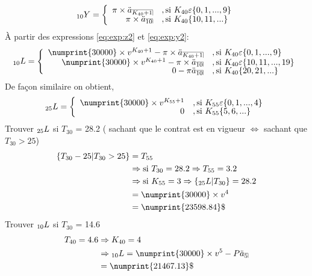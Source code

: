 \documentclass[11pt,french]{report}
\makeatletter
\DeclareRobustCommand{\annuity}[1]{%
\def\arraystretch{0}%
\setlength\arraycolsep{.7pt}%
\setlength\arrayrulewidth{.3pt}%
\begin{array}[b]{@{}c|}\hline
\\[\arraycolsep]%
\scriptstyle #1%
\end{array}%
}
\newcommand{\indiceGauche}[2]{{\vphantom{#2}}_{#1}#2}
\makeatother
\begin{document}
\begin{equation}
\label{eq:exp:y2}
\indiceGauche{10}{Y} =
     	\left\{
     	\begin{array}{rl}
     	\pi\times \ddot{a}_{\annuity{K_{40} + 1}} &, \text{si } K_{40} \varepsilon \lbrace0,1,..., 9\rbrace\\
		\pi \times \ddot{a}_{\annuity{10}} &, \text{si } K_{40} \lbrace10,11,...\rbrace
     	\end{array}
     	\right.	
\end{equation}
À partir des expressions \ref{eq:exp:z2} et \ref{eq:exp:y2}:
\begin{equation}
	\indiceGauche{10}{L} =
     	\left\{
     	\begin{array}{rl}
     	\numprint{30000}\times v^{K_{40}+1} - \pi \times \ddot{a}_{\annuity{K_{40} + 1}} &, \text{si } K_{40} \varepsilon \lbrace0,1,..., 9\rbrace\\
      	\numprint{30000}\times v^{K_{40}+1} - \pi \times \ddot{a}_{\annuity{10}}  &, \text{si } K_{40} \varepsilon \lbrace 10,11,...,19\rbrace \\
		0 - \pi \ddot{a}_{\annuity{10}} &, \text{si } K_{40} \lbrace20,21,...\rbrace
     	\end{array}
     	\right.							   
\end{equation}
De façon similaire on obtient,
\begin{equation}
\indiceGauche{25}{L} =
     	\left\{
     	\begin{array}{rl}
     	\numprint{30000}\times v^{K_{55}+1} &, \text{si } K_{55} \varepsilon \lbrace0,1,..., 4\rbrace\\
		0 &, \text{si } K_{55} \lbrace5,6,...\rbrace
     	\end{array}
     	\right.	
\end{equation}
Trouver $\indiceGauche{25}{L}$ si $T_{30}$ = 28.2 ( sachant que le contrat est en vigueur $\Leftrightarrow$ sachant que $T_{30} > 25$)
\begin{align*}
\lbrace T_{30} - 25 | T_{30} > 25 \rbrace &= T_{55} \\
&\Rightarrow \text{si } T_{30} = 28.2 \Rightarrow T_{55} = 3.2 \\
&\Rightarrow \text{si } K_{55} = 3 \Rightarrow \lbrace\indiceGauche{25}{L} | T_{30}\rbrace = 28.2 \\
&= \numprint{30000}\times v^4 \\
&= \numprint{23598.84}\$
\end{align*}
Trouver $\indiceGauche{10}{L}$ si $T_{30}$ = 14.6
\begin{align*}
T_{40} = 4.6 &\Rightarrow K_{40} = 4 \\
&\Rightarrow \indiceGauche{10}{L} = \numprint{30000}\times v^5 - P \ddot{a}_{\annuity{5}} \\
&= \numprint{21467.13}\$
\end{align*}
\end{document}
